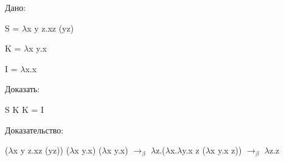 ﻿\documentclass[12pt]{article}
\begin{document}
Дано:

S = $\lambda$x y z.xz (yz)

K = $\lambda$x y.x

I = $\lambda$x.x 

\vspace{5mm}

Доказать:

S K K = I

\vspace{5mm}

Доказательство:

($\lambda$x y z.xz (yz)) ($\lambda$x y.x) ($\lambda$x y.x) 
$\rightarrow_\beta$ 
$\lambda$z.($\lambda$x.$\lambda$y.x z ($\lambda$x y.x z)) 
$\rightarrow_\beta$
$\lambda$z.z 
\end{document}
